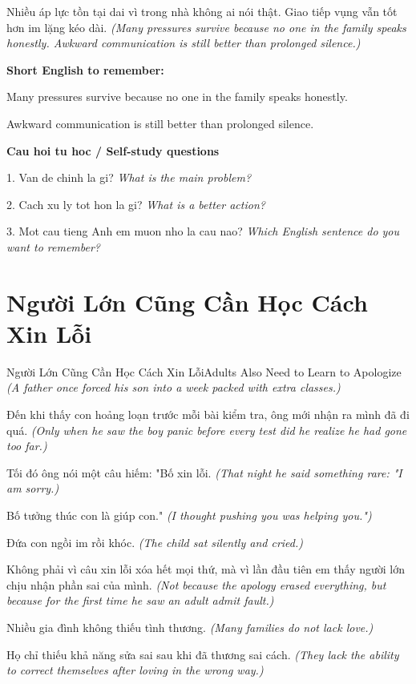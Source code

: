 \begin{baihoc}
Nhiều áp lực tồn tại dai vì trong nhà không ai nói thật. Giao tiếp vụng vẫn tốt hơn im lặng kéo dài.
\textit{(Many pressures survive because no one in the family speaks honestly. Awkward communication is still better than prolonged silence.)}
\end{baihoc}

\begin{ghinhoanh}
\textbf{Short English to remember:}

Many pressures survive because no one in the family speaks honestly.

Awkward communication is still better than prolonged silence.

\end{ghinhoanh}

\begin{tuhocnhanh}
\textbf{Cau hoi tu hoc / Self-study questions}

1. Van de chinh la gi? \textit{What is the main problem?}

2. Cach xu ly tot hon la gi? \textit{What is a better action?}

3. Mot cau tieng Anh em muon nho la cau nao? \textit{Which English sentence do you want to remember?}
\end{tuhocnhanh}
\ngancach

\section{Người Lớn Cũng Cần Học Cách Xin Lỗi}
\begin{truyen}{Người Lớn Cũng Cần Học Cách Xin Lỗi}{Adults Also Need to Learn to Apologize}
\textit{(A father once forced his son into a week packed with extra classes.)}

Đến khi thấy con hoảng loạn trước mỗi bài kiểm tra, ông mới nhận ra mình đã đi quá.
\textit{(Only when he saw the boy panic before every test did he realize he had gone too far.)}

Tối đó ông nói một câu hiếm: "Bố xin lỗi.
\textit{(That night he said something rare: "I am sorry.)}

Bố tưởng thúc con là giúp con."
\textit{(I thought pushing you was helping you.")}

Đứa con ngồi im rồi khóc.
\textit{(The child sat silently and cried.)}

Không phải vì câu xin lỗi xóa hết mọi thứ, mà vì lần đầu tiên em thấy người lớn chịu nhận phần sai của mình.
\textit{(Not because the apology erased everything, but because for the first time he saw an adult admit fault.)}

Nhiều gia đình không thiếu tình thương.
\textit{(Many families do not lack love.)}

Họ chỉ thiếu khả năng sửa sai sau khi đã thương sai cách.
\textit{(They lack the ability to correct themselves after loving in the wrong way.)}

\end{truyen}

